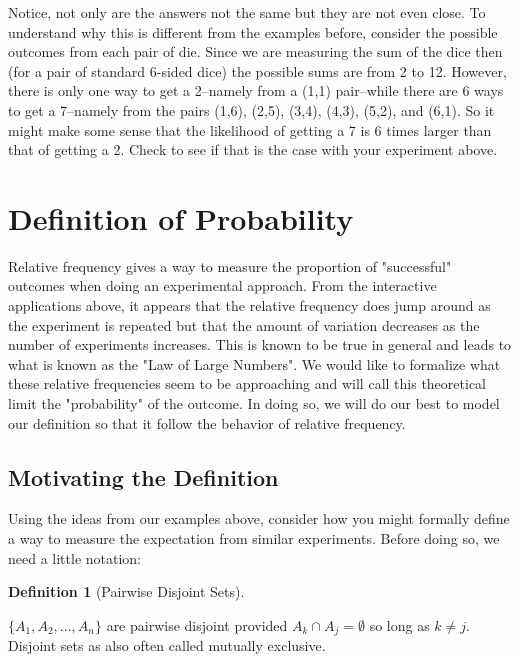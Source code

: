 \documentclass[10pt,]{book}
\theoremstyle{plain}
\theoremstyle{definition}
\newtheorem{definition}[theorem]{Definition}
\theoremstyle{definition}
\theoremstyle{definition}
\numberwithin{equation}{section}
\begin{document}
\par
Notice, not only are the answers not the same but they are not even close. To understand why this 
	is different from the examples before, consider the possible outcomes from each pair of die. Since we
	are measuring the sum of the dice then (for a pair of standard 6-sided dice) the possible sums are from 
	2 to 12. However, there is only one way to get a 2--namely from a (1,1) pair--while there are 6 ways to get
	a 7--namely from the pairs (1,6), (2,5), (3,4), (4,3), (5,2), and (6,1). So it might make some sense
	that the likelihood of getting a 7 is 6 times larger than that of getting a 2. Check to see if that
	is the case with your experiment above.%
\typeout{************************************************}
\typeout{************************************************}
\section[{Definition of Probability}]{Definition of Probability}\label{section-19}
\typeout{************************************************}
\typeout{************************************************}

		Relative frequency gives a way to measure the proportion of "successful" outcomes when doing an experimental approach. From the interactive applications above, it appears that the relative frequency does jump around as the experiment is repeated but that the amount of variation decreases as the number of experiments increases. This is known to be true in general and leads to what is known as the "Law of Large Numbers". We would like to formalize what these relative frequencies seem to be approaching and will call this theoretical limit the "probability" of the outcome. In doing so, we will do our best to model our definition so that it follow the behavior of relative frequency.
\typeout{************************************************}
\typeout{************************************************}
\subsection[{Motivating the Definition}]{Motivating the Definition}\label{ProbabilityDefns}
Using the ideas from our examples above, consider how you might formally define a way
		to measure the expectation from similar experiments.  Before doing so, we need a little notation:%
\begin{definition}[{Pairwise Disjoint Sets}]\label{definition-17}

		\( \{ A_1, A_2, ... , A_n \}\) are pairwise disjoint provided \(A_k \cap A_j = \emptyset\) so long as \(k \ne j\).
		Disjoint sets as also often called mutually exclusive.
\end{definition}
\par
\end{document}
